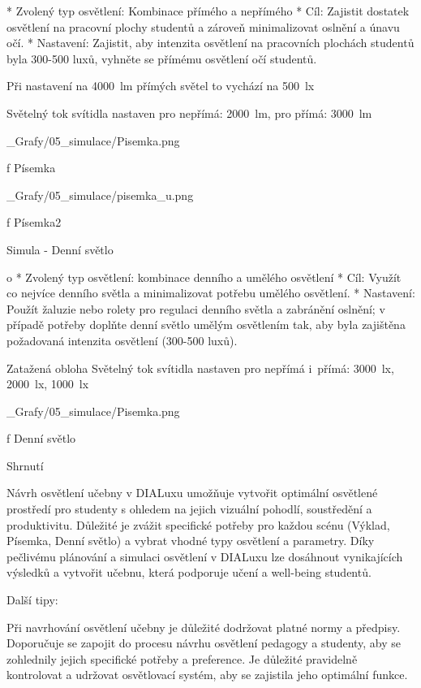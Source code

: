 \begitems
* Zvolený typ osvětlení: Kombinace přímého a nepřímého
* Cíl: Zajistit dostatek osvětlení na pracovní plochy studentů a zároveň minimalizovat oslnění a únavu očí.
* Nastavení: Zajistit, aby intenzita osvětlení na pracovních plochách studentů byla 300-500 luxů, vyhněte se přímému osvětlení očí studentů.
\enditems


Při nastavení na 4000~lm přímých světel to vychází na 500~lx

Světelný tok svítidla nastaven pro nepřímá: 2000~lm, pro přímá: 3000~lm

\medskip {}
\picw=10cm _Grafy/05_simulace/Pisemka.png
\caption/f Písemka
\medskip

\medskip {}
\picw=10cm _Grafy/05_simulace/pisemka_u.png
\caption/f Písemka2
\medskip

\sec Simula - Denní světlo

\begitems \style o
* Zvolený typ osvětlení: kombinace denního a umělého osvětlení
* Cíl: Využít co nejvíce denního světla a minimalizovat potřebu umělého osvětlení.
* Nastavení: Použít žaluzie nebo rolety pro regulaci denního světla a zabránění oslnění; v případě potřeby doplňte denní světlo umělým osvětlením tak, aby byla zajištěna požadovaná intenzita osvětlení (300-500 luxů).
\enditems

Zatažená obloha
Světelný tok svítidla nastaven pro nepřímá i~přímá: 3000~lx, 2000~lx, 1000~lx

\medskip {}
\picw=10cm _Grafy/05_simulace/Pisemka.png
\caption/f Denní světlo
\medskip




\sec Shrnutí

Návrh osvětlení učebny v DIALuxu umožňuje vytvořit optimální osvětlené prostředí pro studenty s ohledem na jejich
vizuální pohodlí, soustředění a produktivitu. Důležité je zvážit specifické potřeby pro každou scénu
(Výklad, Písemka, Denní světlo) a vybrat vhodné typy osvětlení a parametry. Díky pečlivému plánování
a simulaci osvětlení v DIALuxu lze dosáhnout vynikajících výsledků a vytvořit učebnu, která podporuje učení a well-being studentů.

Další tipy:

Při navrhování osvětlení učebny je důležité dodržovat platné normy a předpisy.
Doporučuje se zapojit do procesu návrhu osvětlení pedagogy a studenty, aby se zohlednily jejich specifické potřeby a preference.
Je důležité pravidelně kontrolovat a udržovat osvětlovací systém, aby se zajistila jeho optimální funkce.